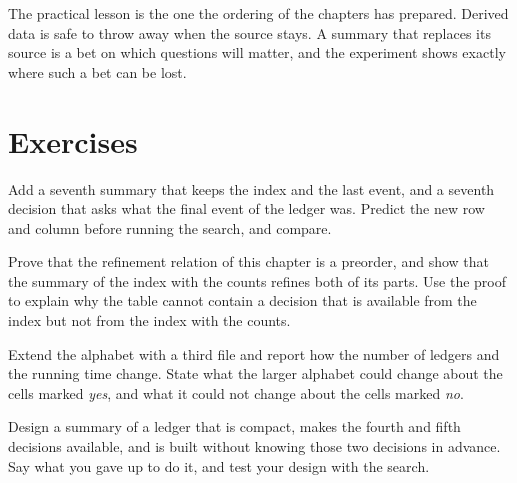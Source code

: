 The practical lesson is the one the ordering of the chapters has prepared. Derived data is safe to throw away when the source stays. A summary that replaces its source is a bet on which questions will matter, and the experiment shows exactly where such a bet can be lost.

\section*{Exercises}

\begin{exercise}
Add a seventh summary that keeps the index and the last event, and a seventh decision that asks what the final event of the ledger was. Predict the new row and column before running the search, and compare.
\end{exercise}

\begin{exercise}
Prove that the refinement relation of this chapter is a preorder, and show that the summary of the index with the counts refines both of its parts. Use the proof to explain why the table cannot contain a decision that is available from the index but not from the index with the counts.
\end{exercise}

\begin{exercise}
Extend the alphabet with a third file and report how the number of ledgers and the running time change. State what the larger alphabet could change about the cells marked \emph{yes}, and what it could not change about the cells marked \emph{no}.
\end{exercise}

\begin{exercise}
Design a summary of a ledger that is compact, makes the fourth and fifth decisions available, and is built without knowing those two decisions in advance. Say what you gave up to do it, and test your design with the search.
\end{exercise}
